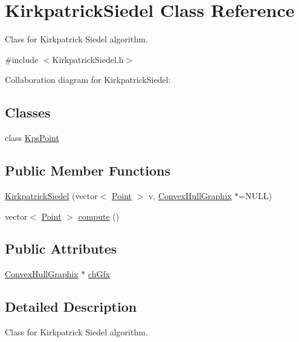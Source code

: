 \hypertarget{class_kirkpatrick_siedel}{}\section{Kirkpatrick\+Siedel Class Reference}
\label{class_kirkpatrick_siedel}


Class for Kirkpatrick Siedel algorithm.  




{\ttfamily \#include $<$Kirkpatrick\+Siedel.\+h$>$}



Collaboration diagram for Kirkpatrick\+Siedel\+:
\subsection*{Classes}
\begin{DoxyCompactItemize}
\item 
class \mbox{\hyperlink{class_kirkpatrick_siedel_1_1_kps_point}{Kps\+Point}}
\end{DoxyCompactItemize}
\subsection*{Public Member Functions}
\begin{DoxyCompactItemize}
\item 
\mbox{\hyperlink{class_kirkpatrick_siedel_a5a565c7cf3c861544bc4a4360ba007ca}{Kirkpatrick\+Siedel}} (vector$<$ \mbox{\hyperlink{class_point}{Point}} $>$ v, \mbox{\hyperlink{class_convex_hull_graphix}{Convex\+Hull\+Graphix}} $\ast$=N\+U\+LL)
\item 
vector$<$ \mbox{\hyperlink{class_point}{Point}} $>$ \mbox{\hyperlink{class_kirkpatrick_siedel_ac301f763865d166ed8e049547adeeb44}{compute}} ()
\end{DoxyCompactItemize}
\subsection*{Public Attributes}
\begin{DoxyCompactItemize}
\item 
\mbox{\hyperlink{class_convex_hull_graphix}{Convex\+Hull\+Graphix}} $\ast$ \mbox{\hyperlink{class_kirkpatrick_siedel_a408d71282f26da0ee4ba9d62a63e73d2}{ch\+Gfx}}
\end{DoxyCompactItemize}


\subsection{Detailed Description}
Class for Kirkpatrick Siedel algorithm. 

